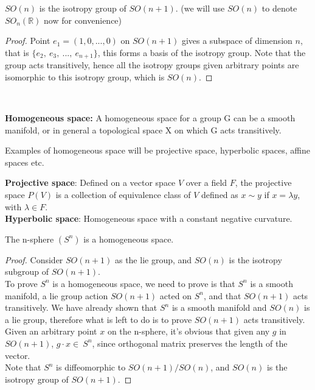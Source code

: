 \documentclass[12pt,twoside]{article}
\begin{document}
\begin{example}
$SO(n)$ is the isotropy group of $SO(n+1)$. (we will use $SO(n)$ to denote $SO_n(\mathbb{R})$ now for convenience)\cite{Rowland}
\begin{proof}
Point $e_{1}=(1,0,...,0)$ on $SO(n+1)$ gives a subspace of dimension $n$, that is $\{e_{2},\ e_{3},\ ...
,\ e_{n+1}\}$, this forms a basis of the isotropy group. Note that the group acts transitively, hence all the isotropy groups given arbitrary points are isomorphic to this isotropy group, which is $SO(n)$.
\end{proof}
\end{example}
\\

\begin{definition}
\textbf{Homogeneous space:} A homogeneous space for a group G can be a smooth manifold, or in general a topological space X on which G acts transitively.
\end{definition}

Examples of homogeneous space will be projective space, hyperbolic spaces, affine spaces etc.
\begin{remark}
\textbf{Projective space}\cite{upenn}: Defined on a vector space $V$ over a field $F$, the projective space $P(V)$ is a collection of equivalence class of $V$ defined as $x\sim y$ if $x= \lambda y$, with $\lambda \in F$.\\
\textbf{Hyperbolic space}: Homogeneous space with a constant negative curvature.
\end{remark}

\begin{example}

The n-sphere $(S^{n})$ is a homogeneous space.
\begin{proof}
Consider $SO(n+1)$ as the lie group, and $SO(n)$ is the isotropy subgroup of $SO(n+1)$.\\
To prove $S^{n}$ is a homogeneous space, we need to prove is that $S^{n}$ is a smooth manifold, a lie group action $SO(n+1)$ acted on $S^{n}$, and that $SO(n+1)$ acts transitively. We have already shown that $S^n$ is a smooth manifold and $SO(n)$ is a lie group, therefore what is left to do is to prove $SO(n+1)$ acts transitively.\\
Given an arbitrary point $x$ on the n-sphere, it's obvious that given any $g$ in $SO(n+1)$, $g\cdot x \in\ S^{n}$, since orthogonal matrix preserves the length of the vector.\\
Note that $S^{n}$ is diffeomorphic to $SO(n+1)/SO(n)$, and $SO(n)$ is the isotropy group of $SO(n+1)$.
\end{proof}
\end{example}
\\
\end{document}
